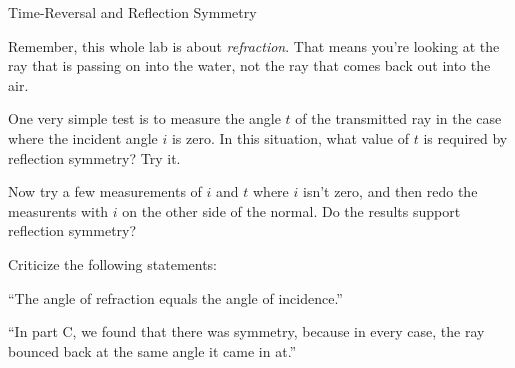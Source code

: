 \begin{lab}{Time-Reversal and Reflection Sym\-met\-ry}

Remember, this whole lab is about \emph{refraction}. That means you're looking at the ray that is
passing on into the water, not the ray that comes back out into the air.

One very simple test is to measure the angle $t$ of the transmitted ray in the case where the incident
angle $i$ is zero. In this situation, what value of $t$ is required by reflection symmetry? Try it.

Now try a few measurements of $i$ and $t$ where $i$ isn't zero, and then redo the measurents with $i$ on
the other side of the normal. Do the results support reflection symmetry?

\pagebreak[4]


Criticize the following statements:

``The angle of refraction equals the angle of incidence.''

``In part C, we found that there was symmetry, because in every case, the ray bounced back at the
same angle it came in at.''

\end{lab}


